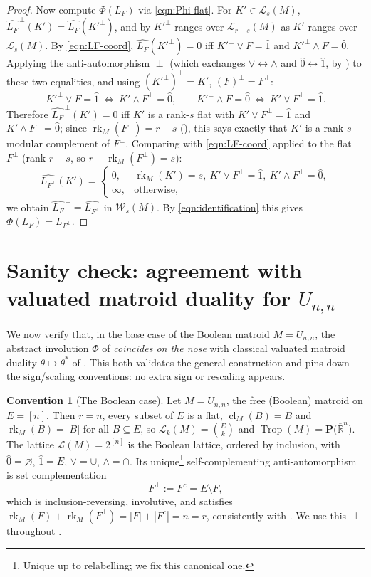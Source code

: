 \documentclass{article}
\theoremstyle{definition}
\newtheorem{convention}[theorem]{Convention}
\newcommand{\Rbar}{\overline{\mathbb{R}}}
\newcommand{\rk}{\operatorname{rk}}
\newcommand{\cl}{\operatorname{cl}}
\newcommand{\Trop}{\operatorname{Trop}}
\newcommand{\cLL}{\mathcal{L}}
\newcommand{\cW}{\mathcal{W}}
\newcommand{\PT}[1]{\mathbf{P}\big(\Rbar^{#1}\big)}
\begin{document}
\begin{proof}
Now compute $\Phi(L_F)$ via \eqref{eqn:Phi-flat}. For $K'\in\cLL_{s}(M)$,
$\widehat{L_F}^{\,\perp}(K')=\widehat{L_F}(K'^{\perp})$, and by  $K'^{\perp}$ ranges
over $\cLL_{r-s}(M)$ as $K'$ ranges over $\cLL_{s}(M)$. By \eqref{eqn:LF-coord},
$\widehat{L_F}(K'^{\perp})=0$ iff $K'^{\perp}\vee F=\hat1$ and $K'^{\perp}\wedge F=\hat0$. Applying
the anti-automorphism $\perp$ (which exchanges $\vee\leftrightarrow\wedge$ and
$\hat0\leftrightarrow\hat1$, by ) to these two equalities, and using
$(K'^{\perp})^{\perp}=K'$, $(F)^{\perp}=F^{\perp}$:
\[
  K'^{\perp}\vee F=\hat1\ \Longleftrightarrow\ K'\wedge F^{\perp}=\hat0,\qquad
  K'^{\perp}\wedge F=\hat0\ \Longleftrightarrow\ K'\vee F^{\perp}=\hat1 .
\]
Therefore $\widehat{L_F}^{\,\perp}(K')=0$ iff $K'$ is a rank-$s$ flat with $K'\vee F^{\perp}=\hat1$
and $K'\wedge F^{\perp}=\hat0$; since $\rk_M(F^{\perp})=r-s$ (), this says exactly
that $K'$ is a rank-$s$ modular complement of $F^{\perp}$. Comparing with \eqref{eqn:LF-coord}
applied to the flat $F^{\perp}$ (rank $r-s$, so $r-\rk_M(F^{\perp})=s$):
\[
  \widehat{L_{F^{\perp}}}(K')=\begin{cases}0,&\rk_M(K')=s,\ K'\vee F^{\perp}=\hat1,\ K'\wedge
  F^{\perp}=\hat0,\\ \infty,&\text{otherwise,}\end{cases}
\]
we obtain $\widehat{L_F}^{\,\perp}=\widehat{L_{F^{\perp}}}$ in $\cW_{s}(M)$. By
\eqref{eqn:identification} this gives $\Phi(L_F)=L_{F^{\perp}}$.
\end{proof}

\section{Sanity check: agreement with valuated matroid duality for \texorpdfstring{$U_{n,n}$}{U(n,n)}}\label{sec:Unn}

We now verify that, in the base case of the Boolean matroid $M=U_{n,n}$, the abstract involution
$\Phi$ of  \emph{coincides on the nose} with classical valuated matroid duality
$\theta\mapsto\theta^{*}$ of . This both validates the general construction and
pins down the sign/scaling conventions: no extra sign or rescaling appears.

\begin{convention}[The Boolean case]\label{conv:Unn}
Let $M=U_{n,n}$, the free (Boolean) matroid on $E=[n]$. Then $r=n$, every subset of $E$ is a flat,
$\cl_M(B)=B$ and $\rk_M(B)=|B|$ for all $B\subseteq E$, so $\cLL_k(M)=\binom{E}{k}$ and
$\Trop(M)=\PT{n}$. The lattice $\cLL(M)=2^{[n]}$ is the Boolean lattice, ordered by inclusion, with
$\hat0=\varnothing$, $\hat1=E$, $\vee=\cup$, $\wedge=\cap$. Its unique\footnote{Unique up to
relabelling; we fix this canonical one.} self-complementing anti-automorphism is set complementation
\[
  F^{\perp}:=F^{c}=E\setminus F,
\]
which is inclusion-reversing, involutive, and satisfies $\rk_M(F)+\rk_M(F^{\perp})=|F|+|F^{c}|=n=r$,
consistently with . We use this $\perp$ throughout .
\end{convention}
\end{document}

